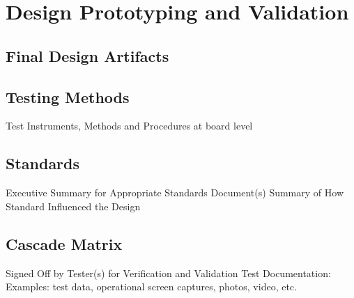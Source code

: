 \chapter{Design Prototyping and Validation}
\section{Final Design Artifacts}
\section{Testing Methods}
Test Instruments, Methods and Procedures at board level
\section{Standards}
Executive Summary for Appropriate Standards Document(s)
Summary of How Standard Influenced the Design
\section{Cascade Matrix}
Signed Off by Tester(s) for Verification and Validation
Test Documentation: Examples: test data, operational screen captures, photos,
video, etc.

